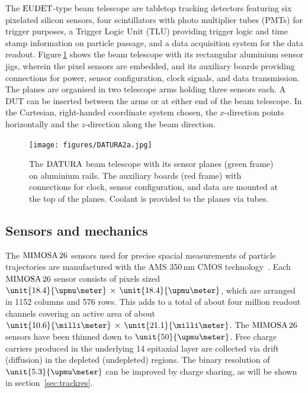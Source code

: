 
The $\textrm{EUDET}$-type beam telescope are tabletop tracking detectors featuring six pixelated silicon sensors, four scintillators with photo multiplier tubes (PMTs) for trigger purposes,
 a Trigger Logic Unit (TLU) providing trigger logic and time stamp information on particle passage, and a data acquisition system for the data readout. 
Figure\,\ref{fig:datura-tscope} shows the beam telescope with its rectangular aluminium sensor jigs, wherein the pixel sensors are embedded,
 and its auxiliary boards providing connections for power, sensor configuration, clock signals, and data transmission. 
The planes are organised in two telescope arms holding three sensors each. 
A DUT can be inserted between the arms or at either end of the beam telescope. 
In the Cartesian, right-handed coordinate system chosen, the $x$-direction points horizontally and the $z$-direction along the beam direction.

\begin{figure}[tb]
	\center
	\texttt{[image: figures/DATURA2a.jpg]}
	\caption[The $\Datura$ telescope]{The $\Datura$ beam telescope with its sensor planes (green frame) on aluminium rails.
	The auxiliary boards (red frame) with connections for clock, sensor configuration, and data are mounted at the top of the planes.
	Coolant is provided to the planes via tubes.}
	\label{fig:datura-tscope}
\end{figure}
 
\subsection{Sensors and mechanics}
\label{sec:sensors}

The $\textrm{MIMOSA\,26}$ sensors used for precise spacial measurements of particle trajectories are manufactured with the AMS 350\,nm CMOS technology~\cite{HuGuo2010480}. 
Each $\textrm{MIMOSA\,26}$ sensor consists of pixels sized $\unit{18.4}{\upmu\meter}\,\times\,\unit{18.4}{\upmu\meter}$, which are arranged in 1152 columns and 576 rows.
This adds to a total of about four million readout channels covering an active area of about $\unit{10.6}{\milli\meter}\,\times\,\unit{21.1}{\milli\meter}$. 
The $\textrm{MIMOSA\,26}$ sensors have been thinned down to $\unit{50}{\upmu\meter}$. 
Free charge carriers produced in the underlying \unit{14}{\upmu\meter} epitaxial layer are collected via drift (diffusion) in the depleted (undepleted) regions. 
The binary resolution of $\unit{5.3}{\upmu\meter}$ can be improved by charge sharing, as will be shown in section~\ref{sec:trackres}.

